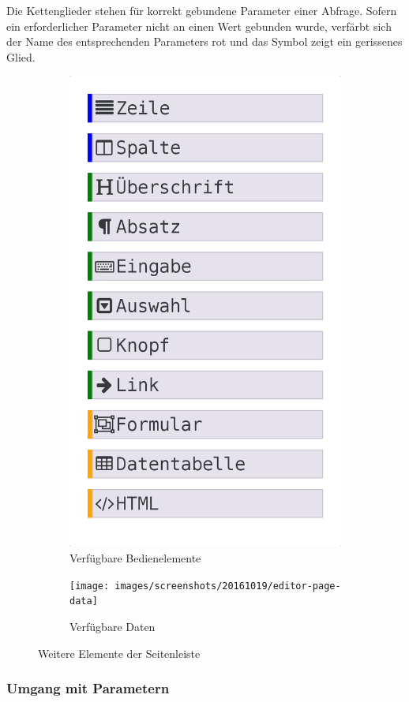 Die Kettenglieder stehen für korrekt gebundene Parameter einer Abfrage. Sofern ein erforderlicher Parameter nicht an einen Wert gebunden wurde, verfärbt sich der Name des entsprechenden Parameters rot und das Symbol zeigt ein gerissenes Glied.

\begin{figure}[h]
  \begin{subfigure}[b]{0.45\textwidth}
    \includegraphics[width=\textwidth]{images/screenshots/20161019/editor-page-widgets}
    \caption{Verfügbare Bedienelemente}
    \label{fig:sidebar-editor-widgets}
  \end{subfigure}\hfill
  \begin{subfigure}[b]{0.45\textwidth}
    \texttt{[image: images/screenshots/20161019/editor-page-data]}
    \caption{Verfügbare Daten}
    \label{fig:sidebar-editor-data}    
  \end{subfigure}
  \caption{Weitere Elemente der Seitenleiste}
  \label{fig:sidebar-widgets}
\end{figure}

\subsubsection{Umgang mit Parametern}
\label{sec:ui-editor-params}


